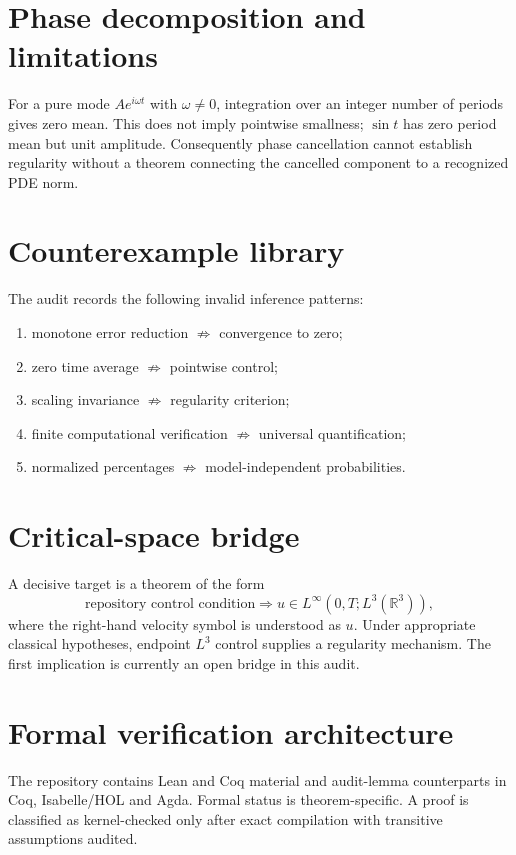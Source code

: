 \documentclass[11pt]{article}
\begin{document}
\section{Phase decomposition and limitations}
For a pure mode $Ae^{i\omega t}$ with $\omega\ne0$, integration over an integer number of periods gives zero mean. This does not imply pointwise smallness; $\sin t$ has zero period mean but unit amplitude. Consequently phase cancellation cannot establish regularity without a theorem connecting the cancelled component to a recognized PDE norm.

\section{Counterexample library}
The audit records the following invalid inference patterns:
\begin{enumerate}[label=(\arabic*)]
\item monotone error reduction $\not\Rightarrow$ convergence to zero;
\item zero time average $\not\Rightarrow$ pointwise control;
\item scaling invariance $\not\Rightarrow$ regularity criterion;
\item finite computational verification $\not\Rightarrow$ universal quantification;
\item normalized percentages $\not\Rightarrow$ model-independent probabilities.
\end{enumerate}

\section{Critical-space bridge}
A decisive target is a theorem of the form
\[
\text{repository control condition}
\Longrightarrow
u\in L^\infty(0,T;L^3(\mathbb R^3)),
\]
where the right-hand velocity symbol is understood as $u$. Under appropriate classical hypotheses, endpoint $L^3$ control supplies a regularity mechanism. The first implication is currently an open bridge in this audit.

\section{Formal verification architecture}
The repository contains Lean and Coq material and audit-lemma counterparts in Coq, Isabelle/HOL and Agda. Formal status is theorem-specific. A proof is classified as kernel-checked only after exact compilation with transitive assumptions audited.
\end{document}
